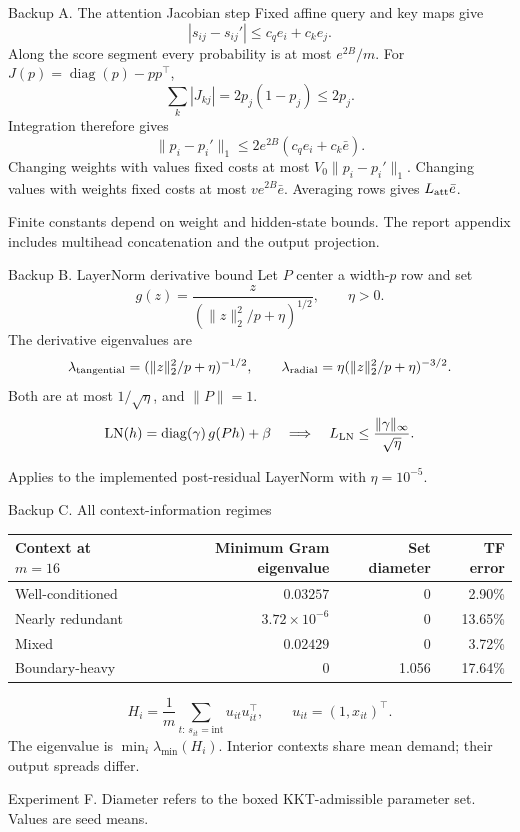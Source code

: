 \documentclass[aspectratio=169,11pt]{beamer}
\newcommand{\source}[1]{\par\vfill{\color{muted}\tiny #1}}
\begin{document}
\begin{frame}[noframenumbering]{Backup A. The attention Jacobian step}
\small
Fixed affine query and key maps give
\[
|s_{ij}-s_{ij}'|\le c_q e_i+c_k e_j.
\]
Along the score segment every probability is at most \(e^{2B}/m\).
For \(J(p)=\operatorname{diag}(p)-pp^\top\),
\[
\sum_k|J_{kj}|=2p_j(1-p_j)\le2p_j.
\]
Integration therefore gives
\[
\|p_i-p_i'\|_1\le2e^{2B}(c_qe_i+c_k\bar e).
\]
Changing weights with values fixed costs at most \(V_0\|p_i-p_i'\|_1\).
Changing values with weights fixed costs at most \(ve^{2B}\bar e\).
Averaging rows gives \(L_{\rm att}\bar e\).
\source{Finite constants depend on weight and hidden-state bounds.
The report appendix includes multihead concatenation and the output projection.}
\end{frame}
\begin{frame}[noframenumbering]{Backup B. LayerNorm derivative bound}
\small
Let \(P\) center a width-\(p\) row and set
\[
g(z)=\frac{z}{(\|z\|_2^2/p+\eta)^{1/2}},\qquad \eta>0.
\]
The derivative eigenvalues are
\[
\lambda_{\rm tangential}
 =(\|z\|_2^2/p+\eta)^{-1/2},
\qquad
\lambda_{\rm radial}
 =\eta(\|z\|_2^2/p+\eta)^{-3/2}.
\]
Both are at most \(1/\sqrt{\eta}\), and \(\|P\|=1\).
\[
\mathrm{LN}(h)=\operatorname{diag}(\gamma)\,g(Ph)+\beta
\quad\Longrightarrow\quad
L_{\rm LN}\le\frac{\|\gamma\|_\infty}{\sqrt{\eta}}.
\]
\source{Applies to the implemented post-residual LayerNorm with \(\eta=10^{-5}\).}
\end{frame}

\begin{frame}[noframenumbering]{Backup C. All context-information regimes}
\begin{center}
\begin{tabular}{lrrr}
\toprule
Context at \(m=16\)&Minimum Gram eigenvalue&Set diameter&TF error\\
\midrule
Well-conditioned&\(0.03257\)&0&2.90\%\\
Nearly redundant&\(3.72\times10^{-6}\)&0&13.65\%\\
Mixed&\(0.02429\)&0&3.72\%\\
Boundary-heavy&0&1.056&17.64\%\\
\bottomrule
\end{tabular}
\end{center}
\vspace{4mm}
\[
H_i=\frac1m\sum_{t:\,s_{it}=\mathrm{int}}u_{it}u_{it}^{\top},
\qquad u_{it}=(1,x_{it})^\top.
\]
\small The eigenvalue is \(\min_i\lambda_{\min}(H_i)\).
Interior contexts share mean demand; their output spreads differ.
\source{Experiment F. Diameter refers to the boxed KKT-admissible parameter set. Values are seed means.}
\end{frame}
\end{document}
